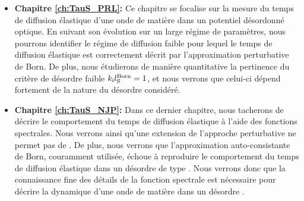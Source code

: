 \begin{itemize}
\item[\textendash] \textbf{Chapitre \ref{ch:TauS_PRL}:} Ce chapitre se focalise sur la mesure du temps de diffusion élastique d'une onde de matière dans un potentiel désordonné optique. En suivant son évolution sur un large régime de paramètres, nous pourrons identifier le régime de diffusion faible pour lequel le temps de diffusion élastique est correctement décrit par l'approximation perturbative de Born. De plus, nous étudierons de manière quantitative la pertinence du critère de désordre faible $k_{\mathrm{i}}l_{\mathrm{S}}^{\mathrm{Born}}=1$, et nous verrons que celui-ci dépend fortement de la nature du désordre considéré. \\

\item[\textendash] \textbf{Chapitre \ref{ch:TauS_NJP}:} Dans ce dernier chapitre, nous tacherons de décrire le comportement du temps de diffusion élastique à l'aide des fonctions spectrales. Nous verrons ainsi qu'une extension de l'approche perturbative ne permet pas de . De plus, nous verrons que l'approximation auto-consistante de Born, couramment utilisée, échoue à reproduire le comportement du temps de diffusion élastique dans un désordre de type \speckle . Nous verrons donc que la connaissance fine des détails de la fonction spectrale est nécessaire pour décrire la dynamique d'une onde de matière dans un désordre \speckle .
\end{itemize}


